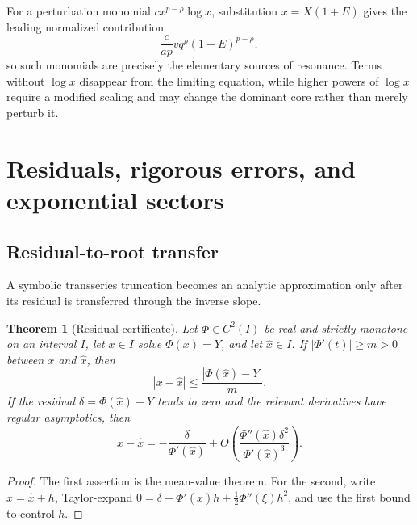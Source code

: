 \documentclass[11pt,oneside]{article}
\theoremstyle{plain}
\newtheorem{theorem}{Theorem}[section]
\theoremstyle{definition}
\theoremstyle{remark}
\begin{document}
For a perturbation monomial
\(c x^{p-\rho}\log x\), substitution
\(x=X(1+E)\) gives the leading normalized contribution
\begin{equation}
 \frac{c}{ap}
 vq^\rho(1+E)^{p-\rho},
 \label{eq:resonant-monomial}
\end{equation}
so such monomials are precisely the elementary sources of resonance.  Terms
without \(\log x\) disappear from the limiting equation, while higher powers
of \(\log x\) require a modified scaling and may change the dominant core
rather than merely perturb it.

\section{Residuals, rigorous errors, and exponential sectors}
\label{sec:residuals}

\subsection{Residual-to-root transfer}

A symbolic transseries truncation becomes an analytic approximation only after
its residual is transferred through the inverse slope.

\begin{theorem}[Residual certificate]
\label{thm:residual-certificate}
Let \(\Phi\in C^2(I)\) be real and strictly monotone on an interval \(I\), let
\(x\in I\) solve \(\Phi(x)=Y\), and let \(\widehat x\in I\).  If
\(|\Phi'(t)|\ge m>0\) between \(x\) and \(\widehat x\), then
\begin{equation}
 |x-\widehat x|
 \le \frac{|\Phi(\widehat x)-Y|}{m}.
 \label{eq:mean-value-certificate}
\end{equation}
If the residual \(\delta=\Phi(\widehat x)-Y\) tends to zero and the relevant
derivatives have regular asymptotics, then
\begin{equation}
 x-\widehat x
 =-\frac{\delta}{\Phi'(\widehat x)}
 +O\!\left(
   \frac{\Phi''(\widehat x)\delta^2}{\Phi'(\widehat x)^3}
 \right).
 \label{eq:residual-newton-expansion}
\end{equation}
\end{theorem}

\begin{proof}
The first assertion is the mean-value theorem.  For the second, write
\(x=\widehat x+h\), Taylor-expand
\(0=\delta+\Phi'(\widehat x)h+\tfrac12\Phi''(\xi)h^2\), and use the first
bound to control \(h\).
\end{proof}
\end{document}
